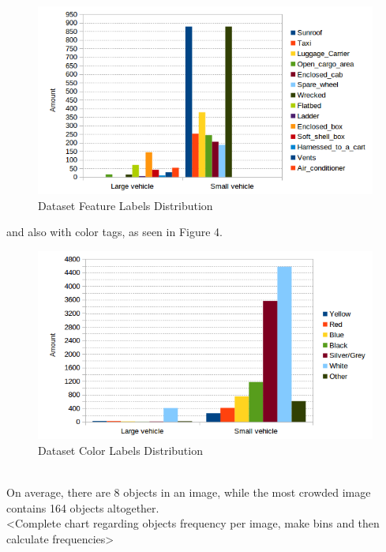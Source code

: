 \documentclass[]{article}
\begin{document}
\begin{figure}[!h]
\centering
\includegraphics[width=0.7\linewidth]{"charts/Dataset Feature Labels Distribution"}
\caption{Dataset Feature Labels Distribution}
\label{fig:Dataset Feature Labels Distribution}
\end{figure}
and also with color tags, as seen in Figure 4.
\begin{figure}[!h]
\centering
\includegraphics[width=0.7\linewidth]{"charts/Dataset Color Labels Distribution"}
\caption{Dataset Color Labels Distribution}
\label{fig:Dataset Color Labels Distribution}
\end{figure}
\\
On average, there are 8 objects in an image, while the most crowded image contains 164 objects altogether.\\

<Complete chart regarding objects frequency per image, make bins and then calculate frequencies>\\
\end{document}
